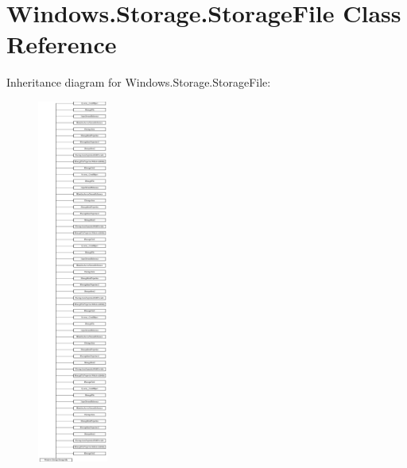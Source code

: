 \hypertarget{class_windows_1_1_storage_1_1_storage_file}{}\section{Windows.\+Storage.\+Storage\+File Class Reference}
\label{class_windows_1_1_storage_1_1_storage_file}
Inheritance diagram for Windows.\+Storage.\+Storage\+File\+:\begin{figure}[H]
\begin{center}
\leavevmode
\includegraphics[height=12.000000cm]{class_windows_1_1_storage_1_1_storage_file}
\end{center}
\end{figure}
